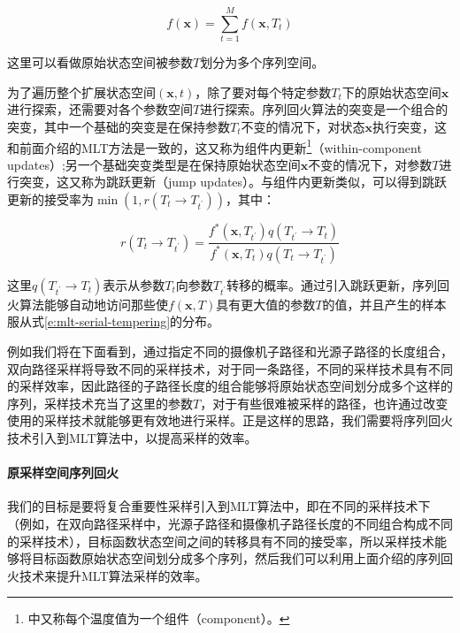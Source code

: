 \begin{equation}\label{e:mlt-serial-tempering}
	f(\mathbf{x})=\sum^{M}_{t=1}f(\mathbf{x},T_t)
\end{equation}

\noindent 这里可以看做原始状态空间被参数$T$划分为多个序列空间。

为了遍历整个扩展状态空间$(\mathbf{x},t)$，除了要对每个特定参数$T_t$下的原始状态空间$\mathbf{x}$进行探索，还需要对各个参数空间$T$进行探索。序列回火算法的突变是一个组合的突变，其中一个基础的突变是在保持参数$T_t$不变的情况下，对状态$\mathbf{x}$执行突变，这和前面介绍的MLT方法是一致的，这又称为组件内更新\footnote{\cite{b:HandbookofMarkovChainMonteCarlo}中又称每个温度值为一个组件（component）。}（within-component updates）;另一个基础突变类型是在保持原始状态空间$\mathbf{x}$不变的情况下，对参数$T$进行突变，这又称为跳跃更新（jump updates）。与组件内更新类似，可以得到跳跃更新的接受率为$\min(1,r(T_t\to T_{t^{'}}))$，其中：

\begin{equation}
	r(T_t\to T_{t^{'}})=\frac{f^{*}(\mathbf{x},T_{t^{'}})q(T_{t^{'}}\to T_t)}{f^{*}(\mathbf{x},T_t)q(T_t\to T_{t^{'}})}
\end{equation}

\noindent 这里$q(T_{t^{'}}\to T_t)$表示从参数$T_t$向参数$T_{t^{'}}$转移的概率。通过引入跳跃更新，序列回火算法能够自动地访问那些使$f(\mathbf{x},T)$具有更大值的参数$T$的值，并且产生的样本服从式\ref{e:mlt-serial-tempering}的分布。

例如我们将在下面看到，通过指定不同的摄像机子路径和光源子路径的长度组合，双向路径采样将导致不同的采样技术，对于同一条路径，不同的采样技术具有不同的采样效率，因此路径的子路径长度的组合能够将原始状态空间划分成多个这样的序列，采样技术充当了这里的参数$T$，对于有些很难被采样的路径，也许通过改变使用的采样技术就能够更有效地进行采样。正是这样的思路，我们需要将序列回火技术引入到MLT算法中，以提高采样的效率。




\paragraph{原采样空间序列回火}
我们的目标是要将复合重要性采样引入到MLT算法中，即在不同的采样技术下（例如，在双向路径采样中，光源子路径和摄像机子路径长度的不同组合构成不同的采样技术），目标函数状态空间之间的转移具有不同的接受率，所以采样技术能够将目标函数原始状态空间划分成多个序列，然后我们可以利用上面介绍的序列回火技术来提升MLT算法采样的效率。

